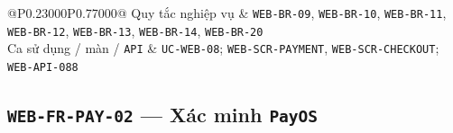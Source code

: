 \begin{longtable}{@{}P{0.23000\SRSWidth}P{0.77000\SRSWidth}@{}}
Quy tắc nghiệp vụ & \texttt{WEB-\allowbreak{}BR-\allowbreak{}09}, \texttt{WEB-\allowbreak{}BR-\allowbreak{}10}, \texttt{WEB-\allowbreak{}BR-\allowbreak{}11}, \texttt{WEB-\allowbreak{}BR-\allowbreak{}12}, \texttt{WEB-\allowbreak{}BR-\allowbreak{}13}, \texttt{WEB-\allowbreak{}BR-\allowbreak{}14}, \texttt{WEB-\allowbreak{}BR-\allowbreak{}20} \\[3pt]
Ca sử dụng /\allowbreak{} màn /\allowbreak{} \texttt{API} & \texttt{UC-\allowbreak{}WEB-\allowbreak{}08}; \texttt{WEB-\allowbreak{}SCR-\allowbreak{}PAYMENT}, \texttt{WEB-\allowbreak{}SCR-\allowbreak{}CHECKOUT\allowbreak{}}; \texttt{WEB-\allowbreak{}API-\allowbreak{}088} \\[3pt]
\end{longtable}
\endgroup

\subsection{\texttt{WEB-\allowbreak{}FR-\allowbreak{}PAY-\allowbreak{}02} — Xác minh \texttt{Pay\allowbreak{}OS}}
\begingroup
\fontsize{9.5}{12}\selectfont
\setlength{\SRSWidth}{\dimexpr\linewidth-2\tabcolsep\relax}
